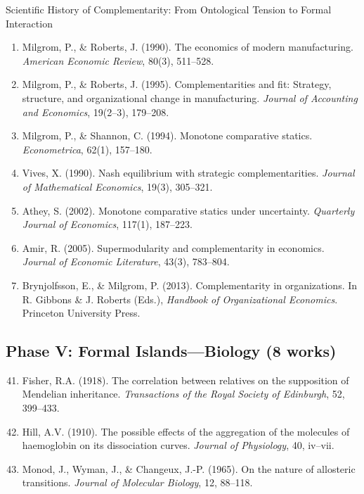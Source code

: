 \begin{chapter}{Scientific History of Complementarity: From Ontological Tension to Formal Interaction}
\begin{enumerate}
    \item Milgrom, P., \& Roberts, J. (1990). The economics of modern manufacturing. \textit{American Economic Review}, 80(3), 511--528.

    \item Milgrom, P., \& Roberts, J. (1995). Complementarities and fit: Strategy, structure, and organizational change in manufacturing. \textit{Journal of Accounting and Economics}, 19(2--3), 179--208.

    \item Milgrom, P., \& Shannon, C. (1994). Monotone comparative statics. \textit{Econometrica}, 62(1), 157--180.

    \item Vives, X. (1990). Nash equilibrium with strategic complementarities. \textit{Journal of Mathematical Economics}, 19(3), 305--321.

    \item Athey, S. (2002). Monotone comparative statics under uncertainty. \textit{Quarterly Journal of Economics}, 117(1), 187--223.

    \item Amir, R. (2005). Supermodularity and complementarity in economics. \textit{Journal of Economic Literature}, 43(3), 783--804.

    \item Brynjolfsson, E., \& Milgrom, P. (2013). Complementarity in organizations. In R. Gibbons \& J. Roberts (Eds.), \textit{Handbook of Organizational Economics}. Princeton University Press.
\end{enumerate}

\subsection{Phase V: Formal Islands---Biology (8 works)}

\begin{enumerate}
    \setcounter{enumi}{40}
    \item Fisher, R.A. (1918). The correlation between relatives on the supposition of Mendelian inheritance. \textit{Transactions of the Royal Society of Edinburgh}, 52, 399--433.

    \item Hill, A.V. (1910). The possible effects of the aggregation of the molecules of haemoglobin on its dissociation curves. \textit{Journal of Physiology}, 40, iv--vii.

    \item Monod, J., Wyman, J., \& Changeux, J.-P. (1965). On the nature of allosteric transitions. \textit{Journal of Molecular Biology}, 12, 88--118.


\end{enumerate}
\end{chapter}
